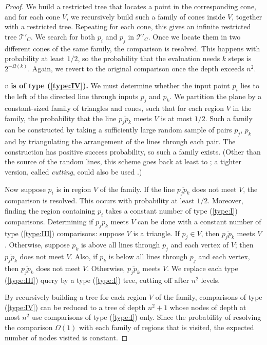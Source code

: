 \documentclass[letterpaper,11pt]{article}
\newcommand{\cT}{\mathcal{T}}
\begin{document}
\begin{proof}
We build a restricted tree 
that locates a point in the 
corresponding cone, and
for each cone $V$, we recursively 
build such a family of cones 
inside $V$, together with a restricted
tree. Repeating for 
each cone, this gives an infinite 
restricted tree $\cT'_C$. We search 
for both $p_i$ and $p_j$ in $\cT'_C$. 
Once we locate them in 
two different cones of the same 
family, the comparison is resolved.
This happens with probability at least
$1/2$, so 
the probability that the evaluation 
needs $k$ steps is 
$2^{-\Omega(k)}$. Again, we revert
to the original comparison once the
depth exceeds $n^2$.

\noindent\textbf{$v$ is of type (\ref{type:IV}).} 
We must determine whether the 
input point $p_i$ lies to the 
left of the directed line 
through inputs $p_j$ and $p_k$.
We partition the plane by a 
constant-sized family of triangles 
and cones, such that for each
region $V$ in the family, the 
probability that the line 
$\overline{p_jp_k}$ meets $V$ is at 
most $1/2$. Such a family can 
be constructed by taking a 
sufficiently large random sample 
of pairs $p_j$, $p_k$
and by triangulating the arrangement 
of the lines through each pair. The
construction has positive success 
probability, so such a family exists. 
(Other than the source of the random 
lines, this 
scheme goes back at least to \cite{Clarkson87}; 
a tighter version, called \emph{cutting}, 
could also be used \cite{Chazelle93}.) 
 
Now suppose $p_i$ is in region $V$ of 
the family. If the line $\overline{p_jp_k}$ 
does not meet $V$, the comparison
is resolved. This occurs with probability 
at least $1/2$. Moreover, finding the 
region containing $p_i$ takes a 
constant number of type (\ref{type:I})
comparisons.  Determining
if $\overline{p_jp_k}$ meets $V$ can be done 
with a constant number of
type (\ref{type:III}) comparisons: 
suppose $V$ is a triangle. 
If $p_j\in V$, then $\overline{p_jp_k}$ 
meets $V$. Otherwise, suppose $p_k$ 
is above all lines through $p_j$ and each
vertex of $V$; then $\overline{p_jp_k}$ does not 
meet $V$. Also, if $p_k$
is below all lines through $p_j$ and 
each vertex, then $\overline{p_j p_k}$
does not meet $V$. Otherwise, $\overline{p_j p_k}$ 
meets $V$. We replace each type (\ref{type:III})
query by a type (\ref{type:I})
tree, cutting off after $n^2$ levels.
 
By recursively building a tree for each
region $V$ of the family, comparisons of 
type (\ref{type:IV}) can be reduced to
a tree of depth $n^2 + 1$
whose nodes of depth at most $n^2$ 
use comparisons of 
type (\ref{type:I}) only. Since 
the probability of 
resolving the comparison $\Omega(1)$
with each family of regions that 
is visited, the expected
number of nodes visited is constant.
\end{proof}
\end{document}
